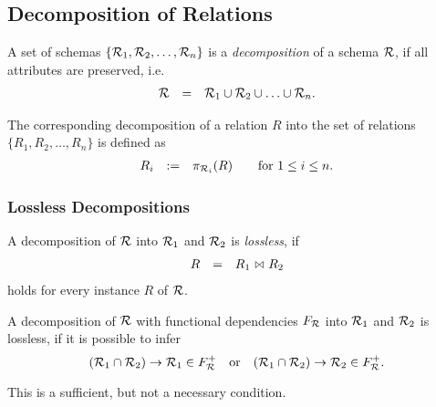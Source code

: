 

\subsection{Decomposition of Relations}

A set of schemas $\{ \mathcal{R}_1,\mathcal{R}_2,\ldots,\mathcal{R}_n \}$ is a \emph{decomposition} of a schema $\mathcal{R}$, if all attributes are preserved, i.e.
\[ \begin{array}{rcl}
\mathcal{R} & = & \mathcal{R}_1 \cup \mathcal{R}_2 \cup \ldots \cup \mathcal{R}_n.
\end{array} \]

The corresponding decomposition of a relation $R$ into the set of relations $\{R_1,R_2,\ldots,R_n\}$ is defined as
\[ \begin{array}{ccc}
 R_i & := & \pi_{\mathcal{R}_i}(R) \qquad\text{for $1\leq i \leq n$.}
\end{array} \]



\subsubsection{Lossless Decompositions}

A decomposition of $\mathcal{R}$ into $\mathcal{R}_1$ and $\mathcal{R}_2$ is \emph{lossless}, if
\[ \begin{array}{rcl}
R & = & R_1 \join R_2
\end{array} \]
holds for every instance $R$ of $\mathcal{R}$.

A decomposition of $\mathcal{R}$ with functional dependencies $F_{\mathcal{R}}$ into $\mathcal{R}_1$ and $\mathcal{R}_2$ is lossless, if it is possible to infer
\[ (\mathcal{R}_1\cap\mathcal{R}_2) \rightarrow \mathcal{R}_1 \in F_{\mathcal{R}}^+
\quad\text{or}\quad
(\mathcal{R}_1\cap\mathcal{R}_2) \rightarrow \mathcal{R}_2 \in F_{\mathcal{R}}^+. \]

\begin{note}
This is a sufficient, but not a necessary condition.
\end{note}





